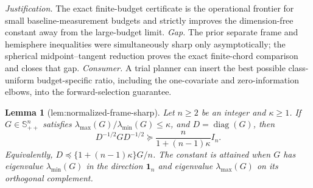 \documentclass{article}
\newtheorem{lemma}{Lemma}
\begin{document}
\par\smallskip\noindent \textit{Justification.} The exact finite-budget certificate is the operational frontier for small baseline-measurement budgets and strictly improves the dimension-free constant away from the large-budget limit. \textit{Gap.} The prior separate frame and hemisphere inequalities were simultaneously sharp only asymptotically; the spherical midpoint--tangent reduction proves the exact finite-chord comparison and closes that gap. \textit{Consumer.} A trial planner can insert the best possible class-uniform budget-specific ratio, including the one-covariate and zero-information elbows, into the forward-selection guarantee.

\begin{lemma}[lem:normalized-frame-sharp]\label{lem:normalized-frame-sharp}
Let \(n\ge2\) be an integer and \(\kappa\ge1\).  If \(G\in\mathbb S_{++}^n\) satisfies \(\lambda_{\max}(G)/\lambda_{\min}(G)\le\kappa\), and \(D=\operatorname{diag}(G)\), then
\[
 D^{-1/2}GD^{-1/2}\succeq \frac{n}{1+(n-1)\kappa}I_n.
\]
Equivalently, \(D\preceq\{1+(n-1)\kappa\}G/n\).  The constant is attained when \(G\) has eigenvalue \(\lambda_{\min}(G)\) in the direction \(\mathbf 1_n\) and eigenvalue \(\lambda_{\max}(G)\) on its orthogonal complement.
\end{lemma}
\end{document}
